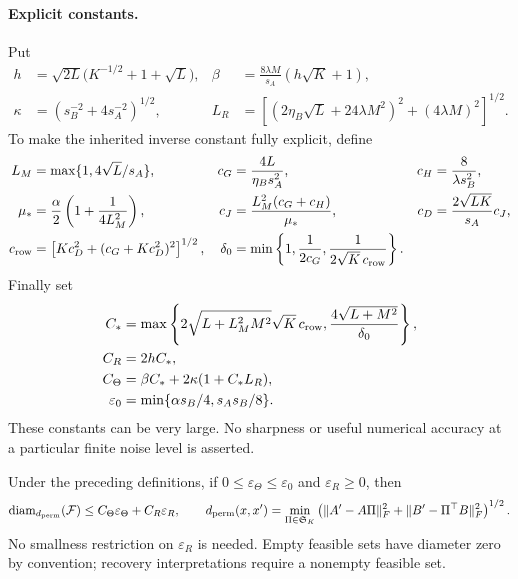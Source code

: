 \paragraph{Explicit constants.}
Put
\begin{align}
 h&=\sqrt{2L}\bigl(K^{-1/2}+1+\sqrt L\bigr),&
 \beta&=\frac{8\lambda M}{s_A}(h\sqrt K+1),\\
 \kappa&=(s_B^{-2}+4s_A^{-2})^{1/2},&
 L_R&=\left[(2\eta_B\sqrt L+24\lambda M^2)^2
                         +(4\lambda M)^2\right]^{1/2}.
 \label{eq:finite-noisy-bridge-constants}
\end{align}
To make the inherited inverse constant fully explicit, define
\begin{align}
 L_M&=\max\{1,4\sqrt L/s_A\},&
 c_G&=\frac{4L}{\eta_Bs_A^2},&
 c_H&=\frac{8}{\lambda s_B^2},\\
 \mu_*&=\frac{\alpha}{2}
              \left(1+\frac{1}{4L_M^2}\right),&
 c_J&=\frac{L_M^2(c_G+c_H)}{\mu_*},&
 c_D&=\frac{2\sqrt{LK}}{s_A}c_J,\\
 c_{\rm row}
 &=\left[Kc_D^2+(c_G+Kc_D^2)^2\right]^{1/2},&
 \delta_0&=\min\left\{1,\frac1{2c_G},
                      \frac1{2\sqrt K\,c_{\rm row}}\right\}.
 \label{eq:finite-noisy-expanded}
\end{align}
Finally set
\begin{align}
 C_*&=\max\left\{
 2\sqrt{L+L_M^2M^2}\sqrt K\,c_{\rm row},
 \frac{4\sqrt{L+M^2}}{\delta_0}\right\},\\
 C_R&=2hC_*,\\
 C_\Theta&=\beta C_*+2\kappa(1+C_*L_R),\\
 \varepsilon_0&=\min\{\alpha s_B/4,s_As_B/8\}.
 \label{eq:finite-noisy-final-constants}
\end{align}
These constants can be very large. No sharpness or useful numerical
accuracy at a particular finite noise level is asserted.

\begin{theorem}
\label{thm:finite-noisy-diameter}
Under the preceding definitions, if
$0\le\varepsilon_\Theta\le\varepsilon_0$ and $\varepsilon_R\ge0$, then
\begin{equation}
 \operatorname{diam}_{d_{\rm perm}}(\mathcal F)
 \le C_\Theta\varepsilon_\Theta+C_R\varepsilon_R,
 \qquad
 d_{\rm perm}(x,x')=
 \min_{\Pi\in\mathfrak S_K}
 \left(\|A'-A\Pi\|_F^2+
       \|B'-\Pi^\top B\|_F^2\right)^{1/2}.
 \label{eq:finite-noisy-diameter}
\end{equation}
No smallness restriction on $\varepsilon_R$ is needed.
Empty feasible sets have diameter zero by convention; recovery
interpretations require a nonempty feasible set.
\end{theorem}


